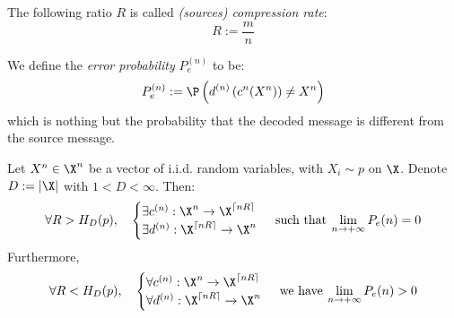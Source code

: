 \documentclass[toc, titlepaged]{../cs-classes/cs-classes}
\begin{document}
\begin{definition}
    The following ratio $R$ is called \emph{(sources) compression rate}:
    \begin{equation}
        \label{eq:compression-rate}
        R:=\frac{m}{n}
    \end{equation}
\end{definition}

\begin{definition}
    We define the \emph{error probability} $P_e^{(n)}$ to be:
    \begin{equation}
        P_e^{(n)}:=\P\left(d^{(n)}\left(c^{n}(X^n)\right)\neq X^n\right)
    \end{equation}
    which is nothing but the probability that the decoded message is different from the source message.
\end{definition}

\begin{theorem}
    \label{th:shannon-first}
    Let $X^n\in \X^n$ be a vector of i.i.d. random variables, with $X_i\sim p$ on $\X$. Denote $D:=|\X|$ with $1<D<\infty$. Then:
    \begin{equation}
        \label{eq:shannon-ft-1}
        \forall R>H_D(p), \quad \begin{cases}
            \exists c^{(n)}:\X^n\to \X^{\lceil nR\rceil} \\
            \exists d^{(n)}:\X^{\lceil nR\rceil}\to \X^n
        \end{cases}\: \textnormal{such that}\: \lim_{n\to+\infty}P_e(n)=0
    \end{equation}
    Furthermore,
    \begin{equation}
        \label{eq:shannon-ft-2}
        \forall R<H_D(p), \quad \begin{cases}
            \forall c^{(n)}:\X^n\to \X^{\lceil nR\rceil} \\
            \forall d^{(n)}:\X^{\lceil nR\rceil}\to \X^n
        \end{cases}\: \textnormal{we have}\: \lim_{n\to+\infty}P_e(n)>0
    \end{equation}
\end{theorem}
\end{document}
